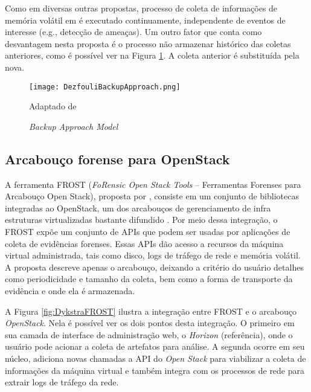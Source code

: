 Como em diversas outras propostas, processo de coleta de informações de memória volátil em \cite{DezfouliBackupApproach:2012} é executado continuamente, independente de eventos de interesse (e.g., detecção de ameaças). 
%
Um outro fator que conta como desvantagem nesta proposta é o processo não armazenar histórico das coletas anteriores, como é possível ver na Figura \ref{fig:DezfouliBackupApproach}. A coleta anterior é substituída pela nova.
%


\begin{figure}[htb!]
\footnotesize
\caption{\textit{Backup Approach Model}}
\texttt{[image: DezfouliBackupApproach.png]}
\centering
\label{fig:DezfouliBackupApproach}
\begin{center}
Adaptado de \cite{DezfouliBackupApproach:2012} 
\end{center}
\end{figure}


\subsection{Arcabouço forense para OpenStack}
\label{sec:frost}

A ferramenta FROST (\textit{FoRensic Open Stack Tools} -- Ferramentas Forenses para Arcabouço Open Stack), proposta por \cite{DykstraFROST:2013}, consiste em um conjunto de bibliotecas integradas ao OpenStack, um dos arcabouços de gerenciamento de infra estruturas virtualizadas bastante difundido \cite{StackFramework:2018}.
%
Por meio dessa integração, o FROST expõe um conjunto de APIs que podem ser usadas por aplicações de coleta de evidências forenses.
%
Essas APIs dão acesso a recursos da máquina virtual administrada, tais como disco, logs de tráfego de rede e memória volátil.
%
A proposta descreve apenas o arcabouço, deixando a critério do usuário detalhes como periodicidade e tamanho da coleta, bem como a forma de transporte da evidência e onde ela é armazenada.


A Figura \ref{fig:DykstraFROST} ilustra a integração entre FROST e o arcabouço \textit{OpenStack}.
%
Nela é possível ver os dois pontos desta integração. O primeiro em sua camada de interface de administração web, o \textit{Horizon} (referência), onde o usuário pode acionar a coleta de artefatos para análise.
%
A segunda ocorre em seu núcleo, adiciona novas chamadas a API do \textit{Open Stack} para viabilizar a coleta de informações da máquina virtual e também integra com os processos de rede para extrair logs de tráfego da rede.



